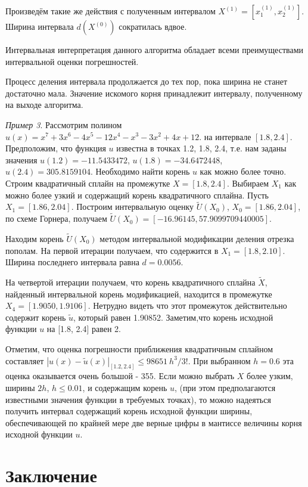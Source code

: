 \documentclass{spisok-article}
\begin{document}
Произведём такие же действия с полученным интервалом $X^{(1)}=[x_1^{(1)}, x_2^{(1)}]$.
Ширина интервала   $d( X^{(0)})$ сократилась вдвое.	

Интервальная интерпретация данного алгоритма обладает всеми преимуществами интервальной оценки погрешностей.

Процесс деления интервала продолжается до тех пор, пока ширина не станет достаточно мала.
  Значение искомого корня принадлежит интервалу, полученному на выходе алгоритма.

  \bigskip
    {\it Пример 3}.
Рассмотрим полином $u(x)=x^7+3x^6-4x^5-12x^4-x^3-3x^2+4x+12$.
 на интервале $[1.8, 2.4]$.
Предположим, что функция $u$ известна в точках 1.2, 1.8, 2.4, т.е. нам заданы
значения $u(1.2)=-11.5433472$, $u(1.8)=-34.6472448$, $u(2.4)= 305.8159104$.
Необходимо найти корень $u$ как можно более точно.
Строим квадратичный сплайн на промежутке $X=[1.8, 2.4]$.
Выбираем $X_1$ как можно более узкий и содержащий корень квадратичного сплайна.
Пусть $X_1=[1.86,2.04]$.
Построим интервальную оценку $\tilde{U}(X_0)$, $X_0=[1.86,2.04]$, по схеме Горнера, получаем
$\tilde{U}(X_0)=[-16.96145, 57.9099709440005]$.

Находим корень $\tilde{U}(X_0)$ методом интервальной модификации деления отрезка пополам.
На первой итерации получаем, что содержится в $X_1=[ 1.8,2.10]$. Ширина последнего интервала равна
$d=0.0056$.

На четвертой итерации получаем, что корень квадратичного сплайна $\tilde{X}$, найденный интервальной корень  модификацией, находится в промежутке $X_4=[ 1.9050, 1.9106]$.
 Нетрудно видеть что этот
промежуток действительно содержит корень $\tilde{u}$, который равен 1.90852.
Заметим,что корень исходной функции $u$ на [1.8, 2.4] равен 2.

Отметим, что оценка погрешности приближения квадратичным сплайном составляет
$|{u}(x)-\tilde{u}(x)|_{[1.2,2.4]}\le 98651 \ h^3/3!$. При выбранном $h=0.6$ эта оценка
оказывается очень большой - 355. 
Если можно выбрать $X$ более узким, ширины $2h$, $h\le 0.01$, и содержащим корень $u$,
 (при этом предполагаются
известными значения функции в требуемых точках), то можно 
надеяться получить интервал содержащий корень исходной функции ширины, обеспечивающей по крайней мере две верные цифры в мантиссе величины корня
исходной функции $u$.

\section{Заключение}
\end{document}

